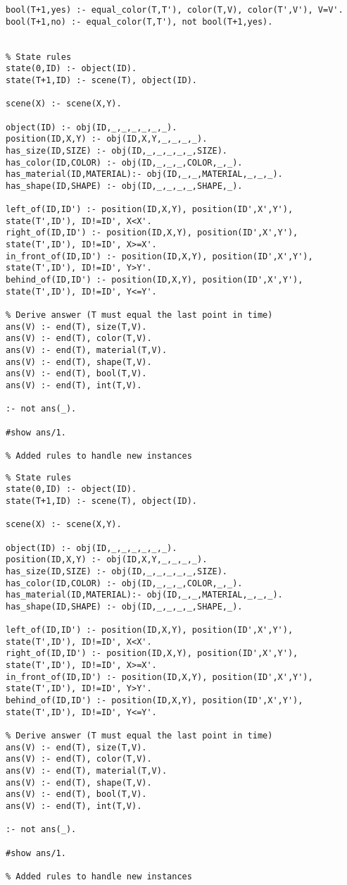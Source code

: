 \begin{lstlisting}
bool(T+1,yes) :- equal_color(T,T'), color(T,V), color(T',V'), V=V'.
bool(T+1,no) :- equal_color(T,T'), not bool(T+1,yes).


% State rules
state(0,ID) :- object(ID).
state(T+1,ID) :- scene(T), object(ID).

scene(X) :- scene(X,Y).

object(ID) :- obj(ID,_,_,_,_,_,_).
position(ID,X,Y) :- obj(ID,X,Y,_,_,_,_).
has_size(ID,SIZE) :- obj(ID,_,_,_,_,_,SIZE).
has_color(ID,COLOR) :- obj(ID,_,_,_,COLOR,_,_).
has_material(ID,MATERIAL):- obj(ID,_,_,MATERIAL,_,_,_).
has_shape(ID,SHAPE) :- obj(ID,_,_,_,_,SHAPE,_).

left_of(ID,ID') :- position(ID,X,Y), position(ID',X',Y'), state(T',ID'), ID!=ID', X<X'.
right_of(ID,ID') :- position(ID,X,Y), position(ID',X',Y'), state(T',ID'), ID!=ID', X>=X'.
in_front_of(ID,ID') :- position(ID,X,Y), position(ID',X',Y'), state(T',ID'), ID!=ID', Y>Y'.
behind_of(ID,ID') :- position(ID,X,Y), position(ID',X',Y'), state(T',ID'), ID!=ID', Y<=Y'.

% Derive answer (T must equal the last point in time)
ans(V) :- end(T), size(T,V).
ans(V) :- end(T), color(T,V).
ans(V) :- end(T), material(T,V).
ans(V) :- end(T), shape(T,V).
ans(V) :- end(T), bool(T,V).
ans(V) :- end(T), int(T,V).

:- not ans(_).

#show ans/1.

% Added rules to handle new instances

\end{lstlisting}

\begin{lstlisting}
% State rules
state(0,ID) :- object(ID).
state(T+1,ID) :- scene(T), object(ID).

scene(X) :- scene(X,Y).

object(ID) :- obj(ID,_,_,_,_,_,_).
position(ID,X,Y) :- obj(ID,X,Y,_,_,_,_).
has_size(ID,SIZE) :- obj(ID,_,_,_,_,_,SIZE).
has_color(ID,COLOR) :- obj(ID,_,_,_,COLOR,_,_).
has_material(ID,MATERIAL):- obj(ID,_,_,MATERIAL,_,_,_).
has_shape(ID,SHAPE) :- obj(ID,_,_,_,_,SHAPE,_).

left_of(ID,ID') :- position(ID,X,Y), position(ID',X',Y'), state(T',ID'), ID!=ID', X<X'.
right_of(ID,ID') :- position(ID,X,Y), position(ID',X',Y'), state(T',ID'), ID!=ID', X>=X'.
in_front_of(ID,ID') :- position(ID,X,Y), position(ID',X',Y'), state(T',ID'), ID!=ID', Y>Y'.
behind_of(ID,ID') :- position(ID,X,Y), position(ID',X',Y'), state(T',ID'), ID!=ID', Y<=Y'.

% Derive answer (T must equal the last point in time)
ans(V) :- end(T), size(T,V).
ans(V) :- end(T), color(T,V).
ans(V) :- end(T), material(T,V).
ans(V) :- end(T), shape(T,V).
ans(V) :- end(T), bool(T,V).
ans(V) :- end(T), int(T,V).

:- not ans(_).

#show ans/1.

% Added rules to handle new instances
\end{lstlisting}

